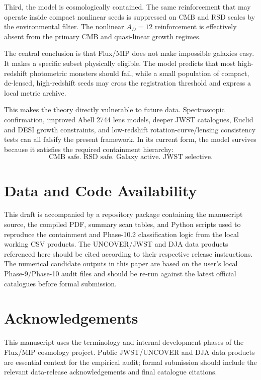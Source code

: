 \documentclass[11pt,a4paper]{article}
\begin{document}
Third, the model is cosmologically contained. The same reinforcement that may operate inside compact nonlinear seeds is suppressed on CMB and RSD scales by the environmental filter. The nonlinear $A_D=12$ reinforcement is effectively absent from the primary CMB and quasi-linear growth regimes.

The central conclusion is that Flux/MIP does not make impossible galaxies easy. It makes a specific subset physically eligible. The model predicts that most high-redshift photometric monsters should fail, while a small population of compact, de-lensed, high-redshift seeds may cross the registration threshold and express a local metric archive.

This makes the theory directly vulnerable to future data. Spectroscopic confirmation, improved Abell 2744 lens models, deeper JWST catalogues, Euclid and DESI growth constraints, and low-redshift rotation-curve/lensing consistency tests can all falsify the present framework. In its current form, the model survives because it satisfies the required containment hierarchy:
\begin{equation}
\boxed{\text{CMB safe. RSD safe. Galaxy active. JWST selective.}}
\end{equation}

\section*{Data and Code Availability}

This draft is accompanied by a repository package containing the manuscript source, the compiled PDF, summary scan tables, and Python scripts used to reproduce the containment and Phase-10.2 classification logic from the local working CSV products. The UNCOVER/JWST and DJA data products referenced here should be cited according to their respective release instructions. The numerical candidate outputs in this paper are based on the user's local Phase-9/Phase-10 audit files and should be re-run against the latest official catalogues before formal submission.

\section*{Acknowledgements}

This manuscript uses the terminology and internal development phases of the Flux/MIP cosmology project. Public JWST/UNCOVER and DJA data products are essential context for the empirical audit; formal submission should include the relevant data-release acknowledgements and final catalogue citations.
\end{document}
